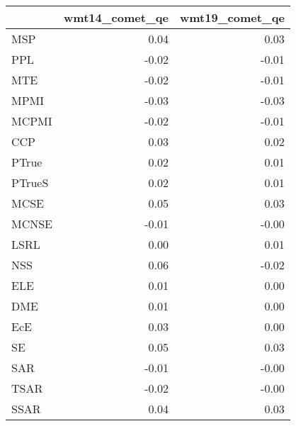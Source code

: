 \begin{tabular}{lrr}
\toprule
 & wmt14\_comet\_qe & wmt19\_comet\_qe \\
\midrule
MSP & 0.04 & 0.03 \\
PPL & -0.02 & -0.01 \\
MTE & -0.02 & -0.01 \\
MPMI & -0.03 & -0.03 \\
MCPMI & -0.02 & -0.01 \\
CCP & 0.03 & 0.02 \\
PTrue & 0.02 & 0.01 \\
PTrueS & 0.02 & 0.01 \\
MCSE & 0.05 & 0.03 \\
MCNSE & -0.01 & -0.00 \\
LSRL & 0.00 & 0.01 \\
NSS & 0.06 & -0.02 \\
ELE & 0.01 & 0.00 \\
DME & 0.01 & 0.00 \\
EcE & 0.03 & 0.00 \\
SE & 0.05 & 0.03 \\
SAR & -0.01 & -0.00 \\
TSAR & -0.02 & -0.00 \\
SSAR & 0.04 & 0.03 \\
\bottomrule
\end{tabular}
